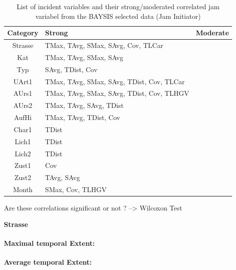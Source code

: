 \noindent
\begin{table}[ht]
	\centering
	\begin{tabular}{c|l|l}  
		\toprule
		\textbf{Category} & \textbf{Strong} & \textbf{Moderate} \\
		\midrule
		Strasse & TMax, TAvg, SMax, SAvg, Cov, TLCar & \\ 
 		Kat & TMax, TAvg, SMax, SAvg & \\ 
 		Typ & SAvg, TDist, Cov & \\
 		UArt1 & TMax, TAvg, SMax, SAvg, TDist, Cov, TLCar & \\
 		AUrs1 & TMax, TAvg, SMax, SAvg, TDist, Cov, TLHGV & \\
 		AUrs2 & TMax, TAvg, SAvg, TDist & \\
 		AufHi & TMax, TAvg, TDist, Cov & \\
 		Char1 & TDist & \\
 		Lich1 & TDist & \\
 		Lich2 & TDist & \\
 		Zust1 & Cov & \\
 		Zust2 & TAvg, SAvg & \\
 		Month & SMax, Cov, TLHGV & \\
 		\bottomrule
	\end{tabular}
	\caption{List of incident variables and their strong/moderated correlated jam variabel from the BAYSIS selected data (Jam Initiator)}
\end{table}

Are these correlations significant or not ? --> Wilcoxon Test

\large
\centerline{\textbf{Strasse}}
\normalsize

\paragraph{Maximal temporal Extent:}
\paragraph{Average temporal Extent:}
